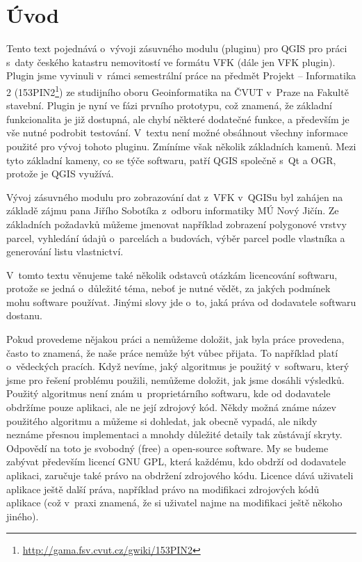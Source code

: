 \documentclass[a4paper,12pt]{article}
\begin{document}
\newpage




\section{Úvod}
Tento text pojednává o~vývoji zásuvného modulu (pluginu) pro QGIS pro práci s~daty českého katastru nemovitostí ve formátu VFK (dále jen VFK plugin).
Plugin jsme vyvinuli v~rámci semestrální práce na předmět Projekt -- Informatika 2 (153PIN2\footnote{\url{http://gama.fsv.cvut.cz/gwiki/153PIN2}}) ze studijního oboru Geoinformatika na ČVUT v~Praze na Fakultě stavební.
Plugin je nyní ve fázi prvního prototypu, což znamená, že základní funkcionalita je již dostupná, ale chybí některé dodatečné funkce, a především je vše nutné podrobit testování.
V~textu není možné obsáhnout všechny informace použité pro vývoj tohoto pluginu.
Zmíníme však několik základních kamenů.
Mezi tyto základní kameny, co se týče softwaru, patří QGIS společně s~Qt a OGR, protože je QGIS využívá.

Vývoj zásuvného modulu pro zobrazování dat z~VFK v~QGISu byl zahájen na základě zájmu pana Jiřího Sobotíka z~odboru informatiky MÚ Nový Jičín.
Ze základních požadavků můžeme jmenovat například zobrazení polygonové vrstvy parcel, vyhledání údajů o~parcelách a budovách, výběr parcel podle vlastníka a generování listu vlastnictví.


V~tomto textu věnujeme také několik odstavců otázkám licencování softwaru, protože se jedná o~důležité téma, neboť je nutné vědět, za jakých podmínek mohu software používat.
Jinými slovy jde o~to, jaká práva od dodavatele softwaru dostanu.

Pokud provedeme nějakou práci a nemůžeme doložit, jak byla práce provedena, často to znamená, že naše práce nemůže být vůbec přijata.
To například platí o~vědeckých pracích.
Když nevíme, jaký algoritmus je použitý v~softwaru, který jsme pro řešení problému použili, nemůžeme doložit, jak jsme dosáhli výsledků.
Použitý algoritmus není znám u~proprietárního softwaru, kde od dodavatele obdržíme pouze aplikaci, ale ne její zdrojový kód.
Někdy možná známe název použitého algoritmu a můžeme si dohledat, jak obecně vypadá, ale nikdy neznáme přesnou implementaci a mnohdy důležité detaily tak zůstávají skryty.
Odpovědí na toto je svobodný (free) a open-source software.
My se budeme zabývat především licencí GNU GPL, která každému, kdo obdrží od dodavatele aplikaci, zaručuje také právo na obdržení zdrojového kódu.
Licence dává uživateli aplikace ještě další práva, například právo na modifikaci zdrojových kódů aplikace (což v~praxi znamená, že si uživatel najme na modifikaci ještě někoho jiného).
\end{document}
